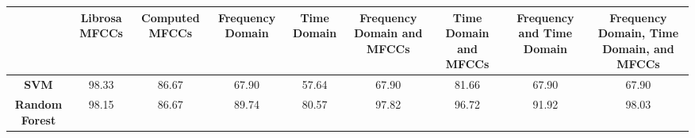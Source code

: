 \documentclass{article}
\begin{document}
\begin{landscape} %
\begin{center}
\begin{adjustbox}{width=\textwidth,center}
\renewcommand{\arraystretch}{1.5} %
\Large %
\begin{tabular}{|| c || c | c | c | c | c |c | c | c||} 
 \hline
  & \textbf{Librosa MFCCs} & \textbf{Computed MFCCs} & \textbf{Frequency Domain} & \textbf{Time Domain} & \textbf{Frequency Domain and MFCCs} & \textbf{Time Domain and MFCCs} &\textbf{Frequency and Time Domain} & \textbf{Frequency Domain, Time Domain, and MFCCs} \\ 
 \hline\hline
 \textbf{SVM} & 98.33 & 86.67 & 67.90  & 57.64 & 67.90 & 81.66 & 67.90 &  67.90\\ 
 \hline
 \textbf{Random Forest} & 98.15 & 86.67 & 89.74 & 80.57 & 97.82 & 96.72 & 91.92 & 98.03 \\ 
 \hline
\end{tabular}
\end{adjustbox}
\end{center}
\end{landscape} %
\end{document}
